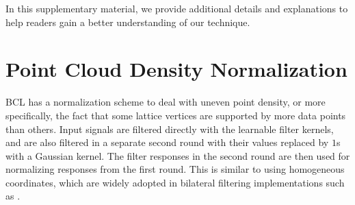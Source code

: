 \documentclass[10pt,twocolumn,letterpaper]{article}
\newcommand{\camreadycomment}[1]{{\textcolor{red}{#1}}}
\begin{document}



{\small


}

\newpage
\clearpage
{}
\vspace{0.3cm}


\renewcommand\thesection{\Alph{section}}

In this supplementary material, we provide additional details and explanations to help readers gain 
a better understanding of our technique. 



\section{Point Cloud Density Normalization}%
BCL has a normalization scheme to deal with uneven point density, or more specifically, the fact that some lattice vertices are supported by more data points than others.
Input signals are filtered directly with the learnable filter kernels, and are also filtered in a separate second round with their values replaced by $1$s with a Gaussian kernel. The filter responses in the second round are then used for normalizing responses from the first round.
This is similar
to using homogeneous coordinates, which are widely adopted in bilateral filtering implementations such as \cite{adams2010fast}.
\end{document}
